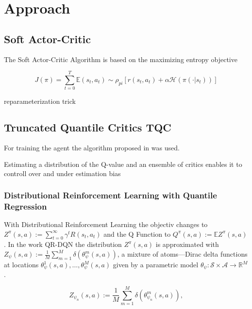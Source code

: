 \chapter{Approach}\label{chap:approach}


\section{Soft Actor-Critic}

The Soft Actor-Critic Algorithm \cite{haarnoja2018soft} is based on the maximizing entropy objective

\begin{equation}
\label{eq:maxent_objective}
  J(\pi)  = \sum_{t=0}^{T} \mathbb{E}(s_{t}, a_{t}) \sim \rho_{pi}[r(s_{t},a_{t}) + \alpha \mathcal{H}(\pi(\cdot|s_{t}))]
\end{equation}





reparameterization trick


\section{Truncated Quantile Critics TQC}

For training the agent the algorithm proposed in \cite{} was used.

Estimating a distribution of the Q-value and an ensemble of critics
enables it to controll  over and under estimation bias  


\subsection{Distributional Reinforcement Learning with
Quantile Regression}

With Distributional Reinforcement Learning the objectiv changes to
$ Z^{\pi}(s, a) := \sum_{t=0}^{\infty} \gamma^{t} R\left(s_{t}, a_{t}\right)$
and the Q Function to $Q^{\pi}(s, a):=  \mathbb{E} {Z^{\pi}(s, a)}$.
In the work QR-DQN %
the distribution $Z^\pi(s,a)$ is approximated with
$ Z_{\psi}(s, a):=\frac{1}{M} \sum_{m=1}^{M} \delta ( \theta^{m}_\psi(s, a) )$,
a mixture of atoms---Dirac delta functions at locations $\theta^1_\psi(s,a), \dots ,\theta^M_\psi(s,a)$ 
given by a parametric model  $\theta_{\psi}: \mathcal{S} \times \mathcal{A} \rightarrow \mathbb{R}^M$.





\begin{equation}
  Z_{\psi_n}(s, a) := \frac{1}{M} \sum_{m=1}^{M} \delta \left(\theta_{\psi_n}^m(s, a) \right) ,
\end{equation}

